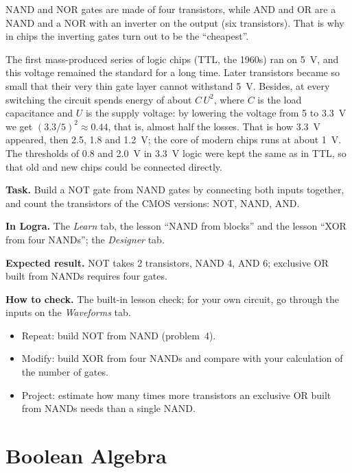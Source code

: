 NAND and NOR gates are made of four transistors, while AND and OR are
a NAND and a NOR with an inverter on the output (six transistors). That is why in
chips the inverting gates turn out to be the ``cheapest''.

\begin{infobox}[Why 3.3~V]
The first mass-produced series of logic chips (TTL, the 1960s) ran on
5~V, and this voltage remained the standard for a long time. Later transistors became
so small that their very thin gate layer cannot withstand 5~V.
Besides, at every switching the circuit spends energy of about
$C\,U^2$, where $C$ is the load capacitance and $U$ is the supply voltage: by lowering the
voltage from 5 to 3.3~V we get $(3.3/5)^2\approx 0.44$, that is, almost
half the losses. That is how 3.3~V appeared, then 2.5, 1.8 and 1.2~V; the core of
modern chips runs at about 1~V. The thresholds of 0.8 and 2.0~V in 3.3~V logic
were kept the same as in TTL, so that old and new chips could be
connected directly.
\end{infobox}

\begin{diybox}
\textbf{Task.} Build a NOT gate from NAND gates by connecting both inputs
together, and count the transistors of the CMOS versions: NOT, NAND, AND.\par
\textbf{In Logra.} The \emph{Learn} tab, the lesson ``NAND from blocks'' and the lesson
``XOR from four NANDs''; the \emph{Designer} tab.\par
\textbf{Expected result.} NOT takes 2 transistors, NAND 4, AND 6;
exclusive OR built from NANDs requires four gates.\par
\textbf{How to check.} The built-in lesson check; for your own circuit,
go through the inputs on the \emph{Waveforms} tab.
\begin{itemize}[leftmargin=3.4em,labelwidth=3em,labelsep=0.4em,align=left]
  \item[\stars{1}] Repeat: build NOT from NAND (problem~4).
  \item[\stars{2}] Modify: build XOR from four NANDs and compare with your calculation of
    the number of gates.
  \item[\stars{3}] Project: estimate how many times more transistors an
    exclusive OR built from NANDs needs than a single NAND.
\end{itemize}
\end{diybox}

\section{Boolean Algebra}

